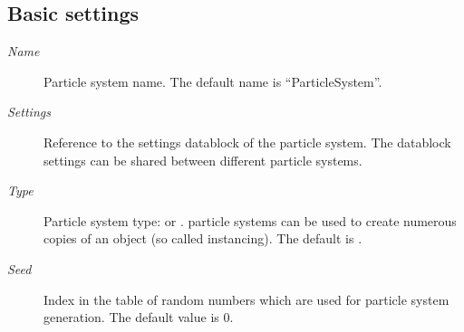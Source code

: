 \documentclass[a4paper,12pt,oneside]{sphinxmanual}
\begin{document}
\subsection{Basic settings}
\label{particles:id6}\begin{description}
\item[{\emph{Name}}] \leavevmode
Particle system name. The default name is ``ParticleSystem''.

\item[{\emph{Settings}}] \leavevmode
Reference to the settings datablock of the particle system. The datablock settings can be shared between different particle systems.

\item[{\emph{Type}}] \leavevmode
Particle system type:  or .  particle systems can be used to create numerous copies of an object (so called instancing). The default is .

\item[{\emph{Seed}}] \leavevmode
Index in the table of random numbers which are used for particle system generation. The default value is 0.

\end{description}
\end{document}
